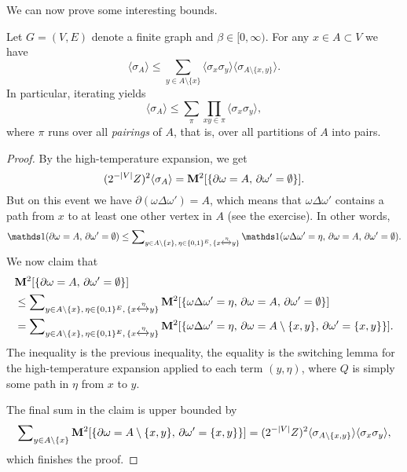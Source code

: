 We can now prove some interesting bounds.

\begin{theorem}
    Let $G=(V,E)$ denote a finite graph and $\beta\in[0,\infty)$.
    For any $x\in A\subset V$ we have
    \begin{equation}
        \langle\sigma_A\rangle
        \leq
        \sum_{y\in A\setminus\{x\}}
        \langle\sigma_x\sigma_y\rangle
        \langle \sigma_{A\setminus\{x,y\}}\rangle.
    \end{equation}
    In particular, iterating yields
    \[
        \langle\sigma_A\rangle
        \leq
        \sum_{\pi}
        \prod_{xy\in\pi}
        \langle\sigma_x\sigma_y\rangle,
    \]
    where $\pi$ runs over all \emph{pairings} of $A$,
    that is, over all partitions of $A$ into pairs.
\end{theorem}

\begin{proof}
    By the high-temperature expansion,
    we get
    \[
        (2^{-|V|}Z)^2 \langle\sigma_A\rangle
        =
        \mathbf{M}^2[\{\partial\omega = A,\,\partial\omega'=\emptyset\}].
    \]
    But on this event we have $\partial(\omega\Delta\omega')=A$,
    which means that $\omega\Delta\omega'$ contains a path
    from $x$ to at least one other vertex in $A$ (see the exercise).
    In other words,
    \[
        \true{\partial\omega = A,\,\partial\omega'=\emptyset}
        \leq
        \sum\nolimits_{y\in A\setminus\{x\},\,\eta\in\{0,1\}^E,\,\{x\xleftrightarrow{\eta}y\}}
        \true{\omega\Delta\omega'=\eta,\,\partial\omega = A,\,\partial\omega'=\emptyset}.
    \]
    We now claim that
    \begin{align}
        &\mathbf{M}^2[\{\partial\omega = A,\,\partial\omega'=\emptyset\}]
        \\&\leq 
            \sum\nolimits_{y\in A\setminus\{x\},\,\eta\in\{0,1\}^E,\,\{x\xleftrightarrow{\eta}y\}}
        \mathbf{M}^2[
        \{\omega\Delta\omega'=\eta,\,\partial\omega = A,\,\partial\omega'=\emptyset\}
        ]
        \\&=
            \sum\nolimits_{y\in A\setminus\{x\},\,\eta\in\{0,1\}^E,\,\{x\xleftrightarrow{\eta}y\}}
        \mathbf{M}^2[
        \{\omega\Delta\omega'=\eta,\,\partial\omega = A\setminus\{x,y\},\,\partial\omega'=\{x,y\}\}
        ].
    \end{align}
    The inequality is the previous inequality,
    the equality is the switching lemma for the high-temperature expansion
    applied to each term $(y,\eta)$,
    where $Q$ is simply some path in $\eta$ from $x$ to $y$.

    The final sum in the claim is upper bounded by
    \[
        \sum\nolimits_{y\in A\setminus\{x\}}
        \mathbf{M}^2[
        \{\partial\omega = A\setminus\{x,y\},\,\partial\omega'=\{x,y\}\}
        ]
        =
        (2^{-|V|}Z)^2 \langle\sigma_{A\setminus\{x,y\}}\rangle\langle\sigma_x\sigma_y\rangle,
    \]
    which finishes the proof.
\end{proof}
